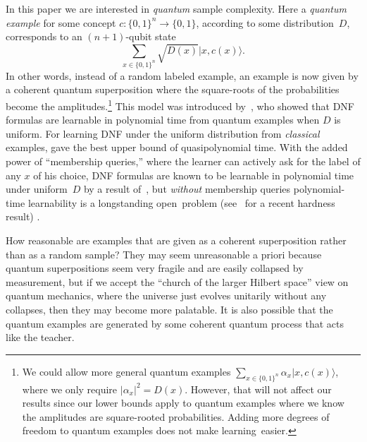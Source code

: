 \documentclass[twoside,11pt]{article}
\newcommand{\ket}[1]{|#1\rangle}
\def\01{\{0,1\}}
\begin{document}
In this paper we are interested in \emph{quantum} sample complexity. Here a \emph{quantum example} for some concept $c:\01^n\to\01$, according to some distribution~$D$, corresponds to an $(n+1)$-qubit state
$$
\sum_{x\in\01^n}\sqrt{D(x)}\ket{x,c(x)}.
$$ 
In other words, instead of a random labeled example, an example is now given by a coherent quantum superposition where the square-roots of the probabilities become the amplitudes.\footnote{We could allow more general quantum examples $\sum_{x\in\01^n}\alpha_x\ket{x,c(x)}$, where we only require $|\alpha_x|^2=D(x)$. However, that will not affect our results since our lower bounds apply to quantum examples where we know the amplitudes are square-rooted probabilities. Adding more degrees of freedom to quantum examples does not make learning~easier.}
This model was introduced by~\cite{bshouty:quantumpac}, who showed that DNF formulas are learnable in polynomial time from quantum examples when $D$ is uniform. For learning DNF under the uniform distribution from \emph{classical} examples, \cite{verbeurgt:learningdnf} gave the best upper bound of quasipolynomial time. With the added power of ``membership queries,'' where the learner can actively ask for the label of any $x$ of his choice, DNF formulas are known to be learnable in polynomial time under uniform~$D$ by a result of~\cite{jackson:dnf}, but \emph{without} membership queries polynomial-time learnability is a longstanding open~problem (see~\cite{daniely&shalevshwartz:limitdnf} for a recent hardness result)
. 

How reasonable are examples that are given as a coherent superposition rather than as a random sample?
They may seem unreasonable a priori because quantum superpositions seem very fragile and are easily collapsed by measurement, but if we accept the ``church of the larger Hilbert space'' view on quantum mechanics, where the universe just evolves unitarily without any collapses, then they may become more palatable. It is also possible that the quantum examples are generated by some coherent quantum process that acts like the teacher. 
\end{document}

